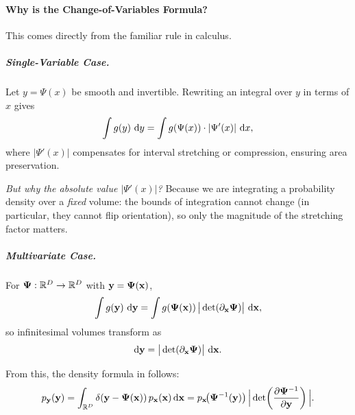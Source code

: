 \paragraph{Why is  the Change-of-Variables Formula?}
This comes directly from the familiar rule in calculus.

\subparagraph{Single-Variable Case.}
Let $y = \Psi(x)$ be smooth and invertible. Rewriting an integral over $y$ in terms of $x$ gives
\[
\int g(y)\,\mathop{}\!\mathrm{d} y = \int g(\Psi(x)) \cdot |\Psi'(x)|\,\mathop{}\!\mathrm{d} x,
\]
where $|\Psi'(x)|$ compensates for interval stretching or compression, ensuring area preservation.
\begin{nknote}
\noindent\textit{But why the absolute value $|\Psi'(x)|$?} Because we are integrating a probability density over a \emph{fixed} volume: the bounds of integration cannot change (in particular, they cannot flip orientation), so only the magnitude of the stretching factor matters.
\end{nknote}

\subparagraph{Multivariate Case.}
For $\bm{\Psi}: \mathbb{R}^D \to \mathbb{R}^D$ with ${\mathbf{y}}=\bm{\Psi}({\mathbf{x}})$,
\[
\int g({\mathbf{y}})\,\mathop{}\!\mathrm{d}{\mathbf{y}}
= \int g(\bm{\Psi}({\mathbf{x}})) \,\big|\det(\partial_{\mathbf{x}} \bm{\Psi})\big| \,\mathop{}\!\mathrm{d}{\mathbf{x}},
\]
so infinitesimal volumes transform as
\[
\mathop{}\!\mathrm{d} {\mathbf{y}} = \big|\det(\partial_{\mathbf{x}} \bm{\Psi})\big|\,\mathop{}\!\mathrm{d} {\mathbf{x}}.
\]

From this, the density formula in  follows:
\begin{align*}
p_{{\mathbf{y}}}({\mathbf{y}})
= \int_{\mathbb{R}^D} \delta({\mathbf{y}} - \bm{\Psi}({\mathbf{x}}))\, p_{{\mathbf{x}}}({\mathbf{x}})\mathop{}\!\mathrm{d} {\mathbf{x}} = p_{{\mathbf{x}}}\!\big(\bm{\Psi}^{-1}({\mathbf{y}})\big)\,\Big|\det\!\left(\frac{\partial \bm{\Psi}^{-1}}{\partial {\mathbf{y}}}\right)\Big|.
\end{align*}

